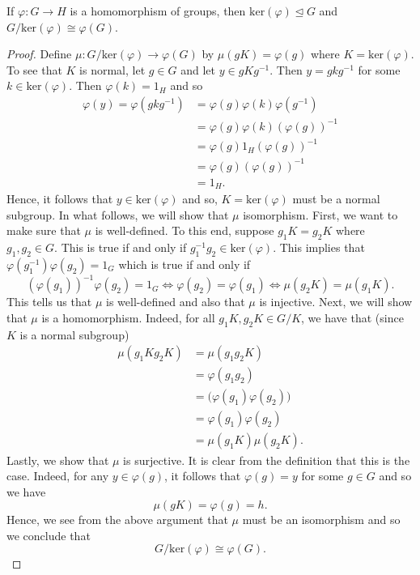 \documentclass[a4paper]{article}
\begin{document}
\begin{theorem}
   If \( \varphi : G \to H  \) is a homomorphism of groups, then \( \text{ker}(\varphi) \trianglelefteq G  \) and \( G / \text{ker}(\varphi) \cong \varphi(G) \). 
\end{theorem}
\begin{proof}
Define \( \mu : G / \text{ker}(\varphi) \to \varphi(G) \) by \( \mu(gK) = \varphi(g)  \) where \( K = \text{ker}(\varphi) \). To see that \( K  \) is normal, let \( g \in G  \) and let \( y \in g K g^{-1} \). Then \( y = g k g^{-1} \) for some \( k \in \text{ker}(\varphi) \). Then \( \varphi(k) = {1}_{H} \) and so 
\begin{align*}
    \varphi(y) = \varphi(g k g^{-1}) &= \varphi(g) \varphi(k) \varphi(g^{-1}) \\   
                                     &= \varphi(g) \varphi(k) (\varphi(g))^{-1} \\
                                     &= \varphi(g) {1}_{H} (\varphi(g))^{-1} \\
                                     &= \varphi(g)(\varphi(g))^{-1} \\
                                     &= {1}_{H}.
\end{align*}
Hence, it follows that \( y \in \text{ker}(\varphi) \) and so, \( K = \text{ker}(\varphi) \) must be a normal subgroup.
In what follows, we will show that \( \mu  \) isomorphism. First, we want to make sure that \( \mu  \) is well-defined. To this end, suppose \( {g}_{1} K = {g}_{2} K   \) where \( {g}_{1}, {g}_{2} \in G  \). This is true if and only if \( {g}_{1}^{-1}{g}_{2} \in \text{ker}(\varphi) \). This implies that \( \varphi({g}_{1}^{-1}) \varphi({g}_{2}) = {1}_{G}  \) which is true if and only if   
\[  (\varphi({g}_{1}))^{-1} \varphi({g}_{2}) = {1}_{G} \iff \varphi({g}_{2}) = \varphi({g}_{1}) \iff \mu({g}_{2}K) = \mu({g}_{1}K).  \]
This tells us that \( \mu  \) is well-defined and also that \( \mu  \) is injective.
Next, we will show that \( \mu  \) is a homomorphism. Indeed, for all \( {g}_{1} K , {g}_{2}  K \in G / K  \), we have that (since \( K  \) is a normal subgroup) 
\begin{align*}
    \mu({g}_{1}K {g}_{2}K) &= \mu({g}_{1}{g}_{2}K) \\ 
                           &= \varphi({g}_{1}{g}_{2})    \\
                           &= \big( \varphi({g}_{1}) \varphi({g}_{2}) \big)   \\
                           &= \varphi({g}_{1})  \varphi({g}_{2}) \\
                           &= \mu({g}_{1}K) \mu({g}_{2}K).
\end{align*}
Lastly, we show that \( \mu   \) is surjective. It is clear from the definition that this is the case. Indeed, for any \( y \in \varphi(g)  \), it follows that \( \varphi(g) = y  \) for some \( g \in G  \) and so we have 
\[  \mu(gK) = \varphi(g) = h.  \]
Hence, we see from the above argument that \( \mu  \) must be an isomorphism and so we conclude that  
\[  G / \text{ker}(\varphi) \cong \varphi(G).  \]
\end{proof}
\end{document}
